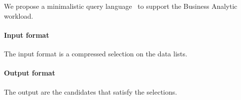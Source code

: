 \section{\queryLanguage}
We propose a minimalistic query language \queryLanguage~to support the Business Analytic workload.

\paragraph{Input format}
\label{par:Input format}
The input format is a compressed selection on the data lists.

\paragraph{Output format}
\label{par:Output format}
The output are the candidates that satisfy the selections.
